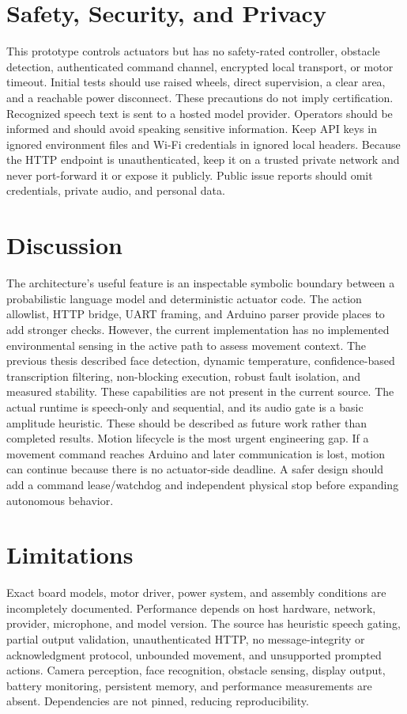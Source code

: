 \documentclass[12pt,a4paper]{report}
\begin{document}
\chapter{Safety, Security, and Privacy}
This prototype controls actuators but has no safety-rated controller, obstacle detection, authenticated command channel, encrypted local transport, or motor timeout. Initial tests should use raised wheels, direct supervision, a clear area, and a reachable power disconnect. These precautions do not imply certification.
Recognized speech text is sent to a hosted model provider. Operators should be informed and should avoid speaking sensitive information. Keep API keys in ignored environment files and Wi-Fi credentials in ignored local headers. Because the HTTP endpoint is unauthenticated, keep it on a trusted private network and never port-forward it or expose it publicly. Public issue reports should omit credentials, private audio, and personal data.
\chapter{Discussion}
The architecture's useful feature is an inspectable symbolic boundary between a probabilistic language model and deterministic actuator code. The action allowlist, HTTP bridge, UART framing, and Arduino parser provide places to add stronger checks. However, the current implementation has no implemented environmental sensing in the active path to assess movement context.
The previous thesis described face detection, dynamic temperature, confidence-based transcription filtering, non-blocking execution, robust fault isolation, and measured stability. These capabilities are not present in the current source. The actual runtime is speech-only and sequential, and its audio gate is a basic amplitude heuristic. These should be described as future work rather than completed results.
Motion lifecycle is the most urgent engineering gap. If a movement command reaches Arduino and later communication is lost, motion can continue because there is no actuator-side deadline. A safer design should add a command lease/watchdog and independent physical stop before expanding autonomous behavior.
\chapter{Limitations}
Exact board models, motor driver, power system, and assembly conditions are incompletely documented. Performance depends on host hardware, network, provider, microphone, and model version. The source has heuristic speech gating, partial output validation, unauthenticated HTTP, no message-integrity or acknowledgment protocol, unbounded movement, and unsupported prompted actions. Camera perception, face recognition, obstacle sensing, display output, battery monitoring, persistent memory, and performance measurements are absent. Dependencies are not pinned, reducing reproducibility.
\end{document}
